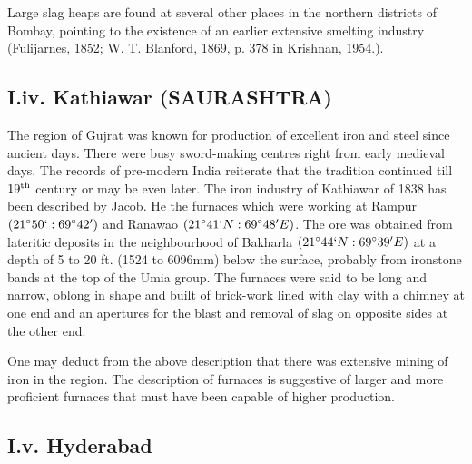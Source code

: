 Large slag heaps are found at several other places in the northern districts of Bombay, pointing to the existence of an earlier extensive smelting industry (Fulijarnes, 1852; W. T. Blanford, 1869, p. 378 in Krishnan, 1954.).

\vspace{-.3cm}

\subsection*{I.iv.  Kathiawar (SAURASHTRA)}\label{subsection-4}

\vspace{-.2cm}

The region of Gujrat was known for production of excellent iron and steel since ancient days. There were busy sword-making centres right from early medieval days. The records of pre-modern India reiterate that the tradition continued till $19^{\rm th}$ century or may be even later. The iron industry of Kathiawar of 1838 has been described by Jacob. He the furnaces which were working at Rampur $(21^\circ 50`: 69^\circ 42')$ and Ranawao $(21^\circ 41`N: 69^\circ 48'E)$. The ore was obtained from lateritic deposits in the neighbourhood of Bakharla $(21^\circ 44`N: 69^\circ 39'E)$ at a depth of 5 to 20 ft. (1524 to 6096mm) below the surface, probably from ironstone bands at the top of the Umia group.  The furnaces were said to be long and narrow, oblong in shape and built of brick-work lined with clay with a chimney at one end and an apertures for the blast and removal of slag on opposite sides at the other end. 

One may deduct from the above description that there was extensive mining of iron in the region. The description of furnaces is suggestive of larger and more proficient furnaces that must have been capable of higher production. 

\vspace{-.3cm}

\subsection*{I.v.  Hyderabad}\label{subsection-5}

\vspace{-.2cm}

